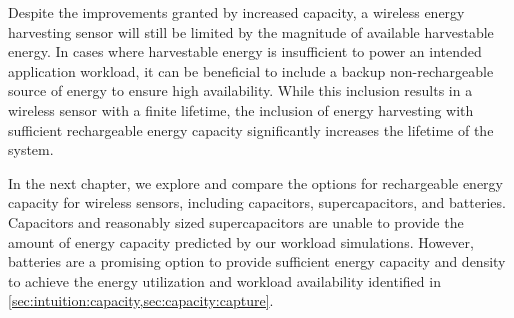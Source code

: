 Despite the improvements granted by increased capacity, a wireless energy harvesting sensor will still be limited by the magnitude of available harvestable energy.
In cases where harvestable energy is insufficient to power an intended application workload, it can be beneficial to include a backup non-rechargeable source of energy to ensure high availability.
While this inclusion results in a wireless sensor with a finite lifetime, the inclusion of energy harvesting with sufficient rechargeable energy capacity significantly increases the lifetime of the system.

In the next chapter, we explore and compare the options for rechargeable energy capacity for wireless sensors, including capacitors, supercapacitors, and batteries. 
Capacitors and reasonably sized supercapacitors are unable to provide the amount of energy capacity predicted by our workload simulations. 
However, batteries are a promising option to provide sufficient energy capacity and density to achieve the energy utilization and workload availability identified in \cref{sec:intuition:capacity,sec:capacity:capture}. 




